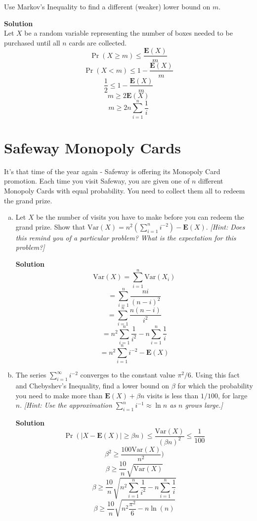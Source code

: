 \documentclass[11pt]{article}
\newcommand*{\Question}[1]{\section{#1}}
\newenvironment{Answer}{\vspace{10pt}\begin{mdframed}\textbf{Solution}\\}{\end{mdframed}\vfill\pagebreak[3]}
\newenvironment{Answer}{\vspace{10pt}}{\vfill\pagebreak[3]}
\newcommand*{\E}{\textbf{E}}
\newcommand*{\Var}[1]{\text{Var}(#1)}
\begin{document}
Use Markov's Inequality to find a different (weaker) lower bound on $m$.

\begin{Answer}
Let $X$ be a random variable representing the number of boxes needed to be purchased until all $n$ cards are collected.
$$\Pr(X\geq m)\leq \frac{\E(X)}{m}$$
$$\Pr(X< m)\leq 1-\frac{\E(X)}{m}$$
$$\frac{1}{2} \leq 1-\frac{\E(X)}{m}$$
$$m \geq 2\E(X)$$ 
$$m \geq 2n\sum_{i=1}^n\frac{1}{i}$$
\end{Answer}

\Question{Safeway Monopoly Cards} 
It's that time of the year again - Safeway is offering its Monopoly Card promotion. Each time you visit Safeway, you are given one of $n$ different Monopoly Cards with equal probability. You need to collect them all to redeem the grand prize.

\begin{enumerate}[(a)]
    \item Let $X$ be the number of visits you have to make before you can redeem the grand prize. Show that $\Var{X} = n^2\left(\sum_{i=1}^n i^{-2}\right) - \E(X)$. \textit{[Hint: Does this remind you of a particular problem? What is the expectation for this problem?]}
    \begin{Answer}
    $$\Var{X}=\sum_{i=1}^n\Var{X_i}$$
    $$=\sum_{i=1}^n \frac{ni}{(n-i)^2}$$
    $$=\sum_{i=1}^n \frac{n(n-i)}{i^2}$$
    $$=n^2\sum_{i=1}^n \frac{1}{i^2}-n\sum_{i=1}^n\frac{1}{i}$$
    $$=n^2\sum_{i=1}^n i^{-2}-\E(X)$$
    \end{Answer}
  
    \item The series $\sum_{i=1}^\infty i^{-2}$ converges to the constant value $\pi^2/6$. Using this fact and Chebyshev's Inequality, find a lower bound on $\beta$ for which the probability you need to make more than $\E(X) + \beta n$ visits is less than $1/100$, for large $n$. \textit{[Hint: Use the approximation $\sum_{i = 1}^n i^{-1} \approx \ln n$ as $n$ grows large.]}
    \begin{Answer}
    $$\Pr(|X-\E(X)|\geq \beta n)\leq \frac{\Var{X}}{(\beta n)^2} \leq \frac{1}{100}$$
    $$\beta^2 \geq \frac{100\Var{X}}{n^2})$$
    $$\beta \geq \frac{10}{n}\sqrt{\Var{X}}$$
    $$\beta \geq \frac{10}{n}\sqrt{n^2\sum_{i=1}^n \frac{1}{i^2}-n\sum_{i=1}^n\frac{1}{i}}$$
    $$\beta \geq \frac{10}{n}\sqrt{n^2\frac{\pi^2}{6}-n\ln(n)}$$
    \end{Answer}
\end{enumerate}
\end{document}

